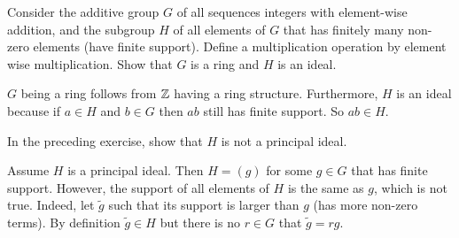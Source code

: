\begin{problem}
	Consider the additive group $ G $ of all sequences integers with element-wise addition, and the subgroup $ H $ of all elements of $ G $ that has finitely many non-zero elements (have finite support). Define a multiplication operation by element wise multiplication. Show that $ G $ is a ring and $ H $ is an ideal.
\end{problem}

\begin{solution}
	$ G $ being a ring follows from $ \mathbb{Z} $ having a ring structure. Furthermore, $ H $ is an ideal because if $ a\in H $ and $ b\in G $ then $ ab $ still has finite support. So $ ab\in H $.
\end{solution}

\begin{problem}
	In the preceding exercise, show that $ H $ is not a principal ideal.
\end{problem}
\begin{solution}
	Assume $ H $ is a principal ideal. Then $ H = (g) $ for some $ g\in G $ that has finite support. However, the support of all elements of $ H $ is the same as $ g $, which is not true. Indeed, let $ \tilde{g} $ such that its support is larger than $ g $ (has more non-zero terms). By definition $ \tilde{g} \in H $ but there is no $ r\in G $ that $ \tilde{g} = r g $.
\end{solution}



